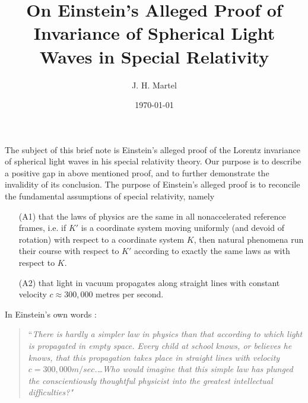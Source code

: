 \documentclass[12pt]{amsart}
\theoremstyle{definition}
\theoremstyle{remark}
\begin{document}
\title{On Einstein's Alleged Proof of Invariance of Spherical Light Waves in Special Relativity}
\author{J. H. Martel}
\date{\today}

\maketitle

The subject of this brief note is Einstein's alleged proof of the Lorentz invariance of spherical light waves in his special relativity theory. Our purpose is to describe a positive gap in above mentioned proof, and to further demonstrate the invalidity of its conclusion. The purpose of Einstein's alleged proof is to reconcile the fundamental assumptions of special relativity, namely
\begin{itemize}

\item[(A1)] that the laws of physics are the same in all nonaccelerated reference frames, i.e. if $K'$ is a coordinate system moving uniformly (and devoid of rotation) with respect to a coordinate system $K$, then natural phenomena run their course with respect to $K'$ according to exactly the same laws as with respect to $K$. 

\item[(A2)] that light in vacuum propagates along straight lines with constant velocity $c\approx 300,000$ metres per second.

\end{itemize}


In Einstein's own words \cite[Ch.7, 11]{einstein2019relativity}:

\begin{quote} ``\emph{There is hardly a simpler law in physics than that according to which light is propagated in empty space. Every child at school knows, or believes he knows, that this propagation takes place in straight lines with velocity $c=300, 000 m/sec$.\ldots Who would imagine that this simple law has plunged the conscientiously thoughtful physicist into the greatest intellectual difficulties?"} \end{quote}
\end{document}

